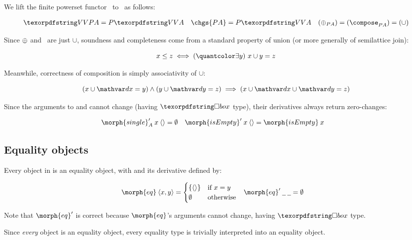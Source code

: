 We lift the finite powerset functor \pfin\ to \CP\ as follows:

\nopagebreak[2]
\begin{align}
  \vals{\pfinof A} &= \pfinof{\vals A} &
  \chgs{\pfinof A} &= \pfinof{\vals A} &
  (\updfn_{\pfinof A}) = (\composefn_{\pfinof A}) = ({\cup})
  \label{eqn:CP-pfin}
\end{align}

\noindent Since ${\mathbin{\oplus}}$ and \composefn\ are just $\cup$, soundness and
completeness come from a standard property of union (or more generally of
semilattice join):

\nopagebreak[2]
\[ x \le z \iff \ex{y} x \cup y = z \]

\noindent Meanwhile, correctness of composition is simply associativity of
$\cup$:

\nopagebreak[2]
\[ (x \cup \dx = y) \wedge (y \cup \dy = z) \implies (x \cup \dx \cup \dy = z) \]

\noindent
Since the arguments to  and  cannot change
(having $\iso$ type), their derivatives always return zero-changes:

\nopagebreak[2]
\begin{align*}
  \deriv{\morph{single}}_A \<x \<\tuple{} &= \emptyset &
  \deriv{\morph{isEmpty}} \<x \<\tuple{} &= \morph{isEmpty} \< x
\end{align*}



\subsection{Equality objects}
\label{sec:CP-eq}

Every object in \CP{} is an equality object, with  and its derivative
defined by:

\nopagebreak[2]
\begin{align*}
  \morph{eq}\<\tuple{x,y} &= 
  \begin{cases}
    \{\tuple{}\} & \text{if}~ x = y\\
    \emptyset & \text{otherwise}
  \end{cases}
  &
  \deriv{\morph{eq}} \<\pwild \<\pwild &= \emptyset
\end{align*}

\noindent Note that $\deriv{\morph{eq}}$ is correct because $\morph{eq}$'s
arguments cannot change, having $\iso$ type.

Since \emph{every} object is an equality object, every equality type
is trivially interpreted into an equality object. 

